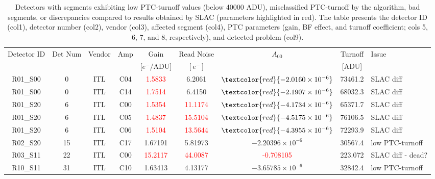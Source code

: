 \begin{landscape}
\begin{table}[!htb]
\centering
\caption{Detectors with segments exhibiting low PTC-turnoff values (below 40000 ADU), misclassified PTC-turnoff by the algorithm, bad segments, or discrepancies compared to results obtained by SLAC (parameters highlighted in red). The table presents the detector ID (col1), detector number (col2), vendor (col3), affected segment (col4), PTC parameters (gain, BF effect, and turnoff coefficient; cols 5, 6, 7, and 8, respectively), and detected problem (col9).}
\label{tab:PTC_warnings}
\begin{tabular}{ccccccccp{}}
    \hline 
     Detector ID   &   Det Num & Vendor   & Amp   &     Gain &   Read Noise &           $A_{00}$ &   Turnoff & Issue\\
      & & & & $[e^-/$ADU$]$ & $[e^-]$ & & [ADU] & \\
    \hline 
    \hline
    R01\_S00       &              0 & ITL      & C04  &   \textcolor{red}{1.5833} &   6.2061                 &  $\textcolor{red}{-2.0160 \times 10^{-6}}$ & 73461.2   &  SLAC diff \\
    R01\_S00       &              0 & ITL      & C14  &   \textcolor{red}{1.7514} &   6.4150                 &  $\textcolor{red}{-2.1907 \times 10^{-6}}$ & 68032.3   &  SLAC diff \\
    R01\_S20       &              6 & ITL      & C00  &   \textcolor{red}{1.5354} & \textcolor{red}{11.1174} &  $\textcolor{red}{-4.1734 \times 10^{-6}}$ & 65371.7   &  SLAC diff \\
    R01\_S20       &              6 & ITL      & C05  &   \textcolor{red}{1.4837} & \textcolor{red}{15.5104} &  $\textcolor{red}{-4.5175 \times 10^{-6}}$ & 76106.5   &  SLAC diff \\
    R01\_S20       &              6 & ITL      & C06  &   \textcolor{red}{1.5104} & \textcolor{red}{13.5644} &  $\textcolor{red}{-4.3955 \times 10^{-6}}$ & 72293.9   &  SLAC diff \\
    R02\_S20       &             15 & ITL      & C17  &      1.67191              &      5.81973             &  $-2.20396 \times 10^{-6}$                 & 30567.4   & low PTC-turnoff\\
    R03\_S11       &             22 & ITL      & C00  & \textcolor{red}{15.2117}  & \textcolor{red}{44.0087} &  \textcolor{red}{-0.708105}                & 223.072   & SLAC diff - dead?\\
    R10\_S11       &             31 & ITL      & C10  &      1.63413              &      4.13177             &  $-3.65785 \times 10^{-6}$                 & 32842.4   & low PTC-turnoff\\

\end{tabular}
\end{table}
\end{landscape}
